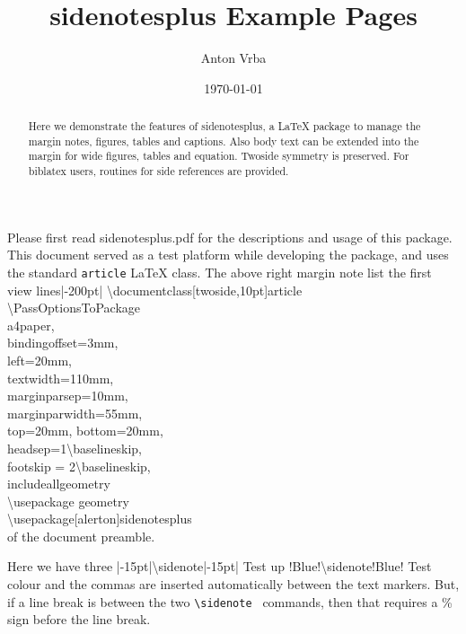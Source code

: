 \documentclass[twoside,10pt]{article}
\title{\textbf{\textsf{sidenotesplus}} Example Pages}
\author{Anton Vrba}
\date{	\today}
\begin{document}
	\maketitle
	
	\begin{abstract}
		\noindent Here we demonstrate the features of \textsf{sidenotesplus},
        a \LaTeX\xspace package to manage the margin notes, figures, tables and captions.
        Also body text can be extended into the margin for wide figures, tables and equation.
        Twoside symmetry is preserved. For biblatex users, routines for side references are
        provided.
	\end{abstract}


Please first read \textsf{sidenotesplus.pdf} for the descriptions and usage of this package.
This document served as a test platform while developing the package, and uses the standard \verb"article" \LaTeX\xspace class. The above right margin note list the first view lines\sidenote|-200pt|{%
\ttfamily\upshape\textbackslash documentclass[twoside,10pt]\textbraceleft article\textbraceright\\
\textbackslash PassOptionsToPackage\textbraceleft\\
\makebox[2ex]{} a4paper,\\
\makebox[2ex]{} bindingoffset=3mm,\\
\makebox[2ex]{} left=20mm,\\
\makebox[2ex]{} textwidth=110mm,\\
\makebox[2ex]{} marginparsep=10mm,\\
\makebox[2ex]{} marginparwidth=55mm,\\
\makebox[2ex]{} top=20mm, bottom=20mm,\\
\makebox[2ex]{} headsep=1\textbackslash baselineskip,\\
\makebox[2ex]{} footskip = 2\textbackslash baselineskip,\\
\makebox[2ex]{} includeall\textbraceright   \textbraceleft geometry\textbraceright\\
\textbackslash usepackage  \textbraceleft geometry\textbraceright\\
\textbackslash usepackage[alerton]\textbraceleft sidenotesplus\textbraceright\\
} of the document preamble.

Here we have three \sidenote|-15pt|{\textsf{\upshape\textbackslash sidenote|-15pt|} Test up}%
\sidenote!Blue!{\textsf{\upshape\textbackslash sidenote!Blue!} Test colour}%
 and the commas are inserted automatically between the text markers. But, if a line break
 is between the two \verb"\sidenote " commands, then that requires a \% sign before the line break.
 
\end{document}
